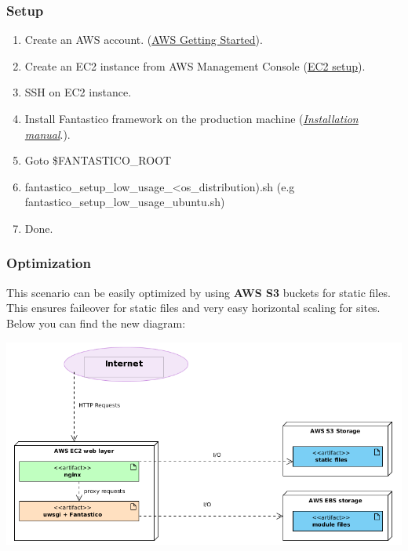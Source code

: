 \documentclass[letterpaper,10pt,english]{sphinxmanual}
\begin{document}
\subsubsection{Setup}
\label{how_to/deployment/aws_low_usage_scenario:setup}\begin{enumerate}
\item {} 
Create an AWS account. (\href{http://aws.amazon.com/documentation/gettingstarted/}{AWS Getting Started}).

\item {} 
Create an EC2 instance from AWS Management Console (\href{http://www.youtube.com/watch?v=WBro0TEAd7g}{EC2 setup}).

\item {} 
SSH on EC2 instance.

\item {} 
Install Fantastico framework on the production machine ({\hyperref[get_started/installation::doc]{\emph{Installation manual}}}.).

\item {} 
Goto \$FANTASTICO\_ROOT

\item {} 
fantastico\_setup\_low\_usage\_\textless{}os\_distribution).sh (e.g fantastico\_setup\_low\_usage\_ubuntu.sh)

\item {} 
Done.

\end{enumerate}


\subsubsection{Optimization}
\label{how_to/deployment/aws_low_usage_scenario:optimization}
This scenario can be easily optimized by using \textbf{AWS S3} buckets for static files. This ensures faileover for static
files and very easy horizontal scaling for sites. Below you can find the new diagram:

\includegraphics{low_usage_s3_aws.png}
\end{document}
